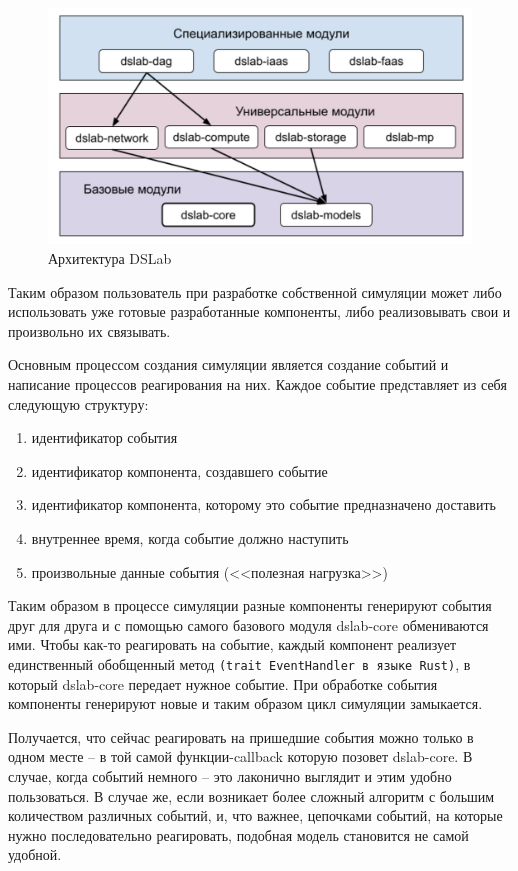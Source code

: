 \begin{figure}[H]
    \centering
    \includegraphics[width=0.7\linewidth]{images/dslab_arc.png}
    \caption{Архитектура DSLab}
    \label{dslab_arc}
\end{figure}



Таким образом пользователь при разработке собственной симуляции может либо использовать уже готовые разработанные компоненты, либо реализовывать свои и произвольно их связывать. 


Основным процессом создания симуляции является создание событий и написание процессов реагирования на них. Каждое событие представляет из себя следующую структуру: 
\begin{enumerate}
    \item идентификатор события 
    \item идентификатор компонента, создавшего событие 
    \item идентификатор компонента, которому это событие предназначено доставить 
    \item внутреннее время, когда событие должно наступить
    \item произвольные данные события (<<полезная нагрузка>>)
\end{enumerate}

Таким образом в процессе симуляции разные компоненты генерируют события друг для друга и с помощью самого базового модуля dslab-core обмениваются ими. Чтобы как-то реагировать на событие, каждый компонент реализует единственный обобщенный метод \texttt{(trait EventHandler в языке Rust)}, в который dslab-core передает нужное событие. При обработке события компоненты генерируют новые и таким образом цикл симуляции замыкается. 

Получается, что сейчас реагировать на пришедшие события можно только в одном месте -- в той самой функции-callback которую позовет dslab-core. В случае, когда событий немного -- это лаконично выглядит и этим удобно пользоваться. В случае же, если возникает более сложный алгоритм с большим количеством различных событий, и, что важнее, цепочками событий, на которые нужно последовательно реагировать, подобная модель становится не самой удобной. 

